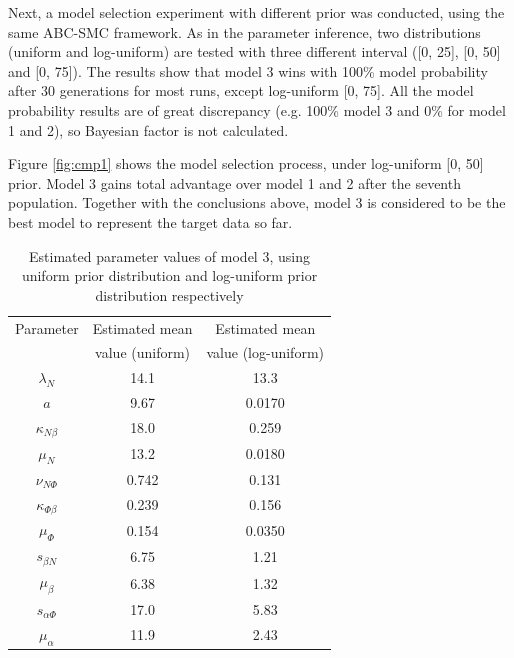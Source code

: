 
Next, a model selection experiment with different prior was conducted, using the same ABC-SMC framework. As in the parameter inference, two distributions (uniform and log-uniform) are tested with three different interval ([0, 25], [0, 50] and [0, 75]). The results show that model 3 wins with 100\% model probability after 30 generations for most runs, except log-uniform [0, 75]. All the model probability results are of great discrepancy (e.g. 100\% model 3 and 0\% for model 1 and 2), so Bayesian factor is not calculated.

Figure \ref{fig:cmp1} shows the model selection process, under log-uniform [0, 50] prior. Model 3 gains total advantage over model 1 and 2 after the seventh population. Together with the conclusions above, model 3 is considered to be the best model to represent the target data so far.

\begin{table}[t!]
    \centering
    \begin{tabular}{|c c c|}
        \hline
        Parameter            & Estimated mean  & Estimated mean      \\
                             & value (uniform) & value (log-uniform) \\[0.5ex]
        \hline\hline
        $\lambda_N$          & 14.1            & 13.3                \\
        $a$                  & 9.67            & 0.0170              \\
        $\kappa_{N\beta}$    & 18.0            & 0.259               \\
        $\mu_N$              & 13.2            & 0.0180              \\
        $\nu_{N\Phi}$        & 0.742           & 0.131               \\
        \hline
        $\kappa_{\Phi\beta}$ & 0.239           & 0.156               \\
        $\mu_\Phi$           & 0.154           & 0.0350              \\
        \hline
        $s_{\beta N}$        & 6.75            & 1.21                \\
        $\mu_\beta$          & 6.38            & 1.32                \\
        \hline
        $s_{\alpha\Phi}$     & 17.0            & 5.83                \\
        $\mu_\alpha$         & 11.9            & 2.43                \\
        \hline
    \end{tabular}
    \caption[Estimated parameter values of model 3]
    {Estimated parameter values of model 3, using uniform prior distribution and log-uniform prior distribution respectively}
    \label{table:estimated1}
\end{table}

